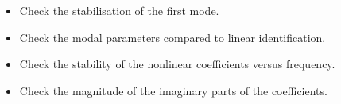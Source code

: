 \begin{itemize}
\item Check the stabilisation of the first mode.
\item Check the modal parameters compared to linear identification.
\item Check the stability of the nonlinear coefficients versus frequency.
\item Check the magnitude of the imaginary parts of the coefficients.
\end{itemize}




